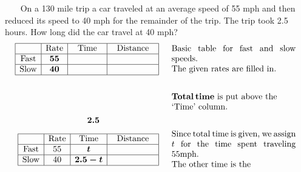 \begin{example}\label{Lin90}~~~ On a 130 mile trip a car traveled at an average speed of 55 mph and then
  reduced its speed to 40 mph for the remainder of the trip. The trip took 2.5
  hours. How long did the car travel at 40 mph?
  \begin{eqnarray*}
    \begin{array}{|c|c|c|c|}
      \hline
      & \tmop{Rate} & \tmop{Time} & \tmop{Distance}\\
      \hline
      \tmop{Fast} & \tmmathbf{55} & \mbox{\hspace{.5in}} & \mbox{\hspace{.7in}}\\
      \hline
      \tmop{Slow} & \tmmathbf{40} &  & \\
      \hline
    \end{array} &  & \begin{array}{p{0.425\textwidth}}
      \tmop{Basic} \tmop{table} \tmop{for} \tmop{fast} \tmop{and} \tmop{slow}
      \tmop{speeds}.\\
      \tmop{The} \tmop{given} \tmop{rates} \tmop{are} \tmop{filled} \tmop{in}.
    \end{array}\\
    &  & \\
    &  & \begin{array}{p{0.425\textwidth}}
		\tmmathbf{\tmop{Total} \tmop{time}} \tmop{is} \tmop{put}
    \tmop{above} \tmop{the}\\ \tmop{`Time'} \tmop{column}.
		\end{array}\\
    \tmmathbf{2.5}~~~~~~~~~~~~~~~~~~~~~  & &\\
		\begin{array}{|c|c|c|c|}
      \hline
      & \tmop{Rate} & \tmop{Time} & \tmop{Distance}\\
      \hline
      \tmop{Fast} & 55 & \tmmathbf{t} & \mbox{\hspace{.7in}}\\
      \hline
      \tmop{Slow} & 40 & \tmmathbf{2.5 - t} & \\
      \hline
    \end{array} &  & \begin{array}{p{0.425\textwidth}}
      \tmop{Since} \tmop{total} \tmop{time} \tmop{is} \tmop{given}, \tmop{we} \tmop{assign} $t$ \tmop{for} \tmop{the} \tmop{time} \tmop{spent} \tmop{traveling} 55mph.\\
      \tmop{The} \tmop{other} \tmop{time} \tmop{is} \tmop{the}

\end{array}
\end{eqnarray*}
\end{example}
